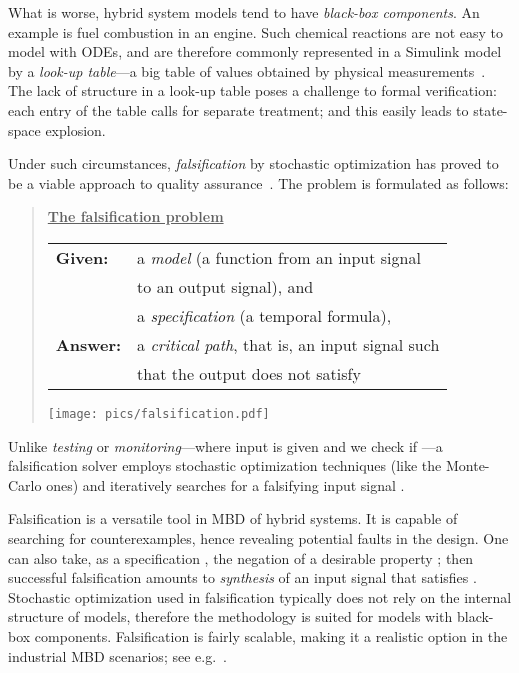 \documentclass[envcountsect,orivec]{llncs} \usepackage{etex} \usepackage[]{graphicx}
\begin{document}
What is worse, hybrid
system models tend to have \emph{black-box components}. An example is
fuel combustion in an engine.  Such chemical reactions are not easy to
model with
ODEs, and are therefore commonly represented in a Simulink model 
by a \emph{look-up table}---a big table of values obtained by  physical measurements~\cite{DBLP:conf/hybrid/JinDKUB14,HoxhaAF14arch1}. 
The lack of structure in a look-up table poses a
challenge to formal verification:  each entry of the table
calls for separate treatment; and this 
easily leads to state-space explosion.

Under such circumstances,  \emph{falsification} by
stochastic optimization has proved to be a viable
approach to quality
assurance~\cite{DBLP:conf/tacas/AnnpureddyLFS11,DBLP:conf/hybrid/JinDKUB14,HoxhaAF14arch1}. The
problem is formulated as follows:
\begin{quote}
  \underline{\bfseries The falsification problem}

  \begin{tabular}{ll}
    \textbf{Given:} 
    & a \emph{model}  (a function from an input signal \\
    & to  an output signal), and\\
    & a \emph{specification}  (a temporal formula),\\
    \textbf{Answer:} 
    & a \emph{critical path}, that is, an input signal  such\\
    & that the output  does not satisfy  
  \end{tabular}
  \texttt{[image: pics/falsification.pdf]}
\end{quote}
Unlike \emph{testing} or \emph{monitoring}---where input  is given and
we check if ---a
falsification solver employs stochastic optimization techniques (like
the Monte-Carlo ones) and iteratively searches for a falsifying input
signal
.

Falsification is a versatile tool in MBD of hybrid systems.  It is
capable of searching for counterexamples, hence revealing potential
faults in the design. One can also take, as a specification ,
the negation  of a desirable property ; then
successful falsification amounts to \emph{synthesis} of an input signal that
satisfies .  Stochastic optimization used in falsification
typically does not rely on the internal structure of models, therefore the
methodology is suited for models with black-box
components. Falsification is fairly scalable, making it 
a realistic option in
the industrial MBD scenarios; see e.g.~\cite{HoxhaAF14arch1,DBLP:conf/hybrid/JinDKUB14}.
\end{document}
